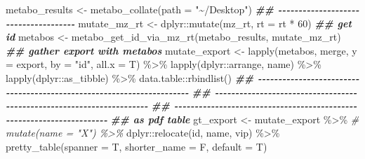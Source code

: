 \documentclass[
]{article}
\newenvironment{Shaded}{\begin{snugshade}}{\end{snugshade}}
\newcommand{\AttributeTok}[1]{\textcolor[rgb]{0.77,0.63,0.00}{#1}}
\newcommand{\CommentTok}[1]{\textcolor[rgb]{0.56,0.35,0.01}{\textit{#1}}}
\newcommand{\DecValTok}[1]{\textcolor[rgb]{0.00,0.00,0.81}{#1}}
\newcommand{\DocumentationTok}[1]{\textcolor[rgb]{0.56,0.35,0.01}{\textbf{\textit{#1}}}}
\newcommand{\FunctionTok}[1]{\textcolor[rgb]{0.00,0.00,0.00}{#1}}
\newcommand{\NormalTok}[1]{#1}
\newcommand{\OtherTok}[1]{\textcolor[rgb]{0.56,0.35,0.01}{#1}}
\newcommand{\SpecialCharTok}[1]{\textcolor[rgb]{0.00,0.00,0.00}{#1}}
\newcommand{\StringTok}[1]{\textcolor[rgb]{0.31,0.60,0.02}{#1}}
\begin{document}
\begin{Shaded}
\begin{Highlighting}[]
\NormalTok{metabo\_results }\OtherTok{\textless{}{-}} \FunctionTok{metabo\_collate}\NormalTok{(}\AttributeTok{path =} \StringTok{"\textasciitilde{}/Desktop"}\NormalTok{)}
\DocumentationTok{\#\# {-}{-}{-}{-}{-}{-}{-}{-}{-}{-}{-}{-}{-}{-}{-}{-}{-}{-}{-}{-}{-}{-}{-}{-}{-}{-}{-}{-}{-}{-}{-}{-}{-}{-}{-}{-}{-} }
\NormalTok{mutate\_mz\_rt }\OtherTok{\textless{}{-}}\NormalTok{ dplyr}\SpecialCharTok{::}\FunctionTok{mutate}\NormalTok{(mz\_rt, }\AttributeTok{rt =}\NormalTok{ rt }\SpecialCharTok{*} \DecValTok{60}\NormalTok{)}
\DocumentationTok{\#\# get id}
\NormalTok{metabos }\OtherTok{\textless{}{-}} \FunctionTok{metabo\_get\_id\_via\_mz\_rt}\NormalTok{(metabo\_results, mutate\_mz\_rt)}
\DocumentationTok{\#\# gather export with metabos}
\NormalTok{mutate\_export }\OtherTok{\textless{}{-}} \FunctionTok{lapply}\NormalTok{(metabos, merge, }\AttributeTok{y =}\NormalTok{ export, }\AttributeTok{by =} \StringTok{"id"}\NormalTok{, }\AttributeTok{all.x =}\NormalTok{ T) }\SpecialCharTok{\%\textgreater{}\%} 
  \FunctionTok{lapply}\NormalTok{(dplyr}\SpecialCharTok{::}\NormalTok{arrange, name) }\SpecialCharTok{\%\textgreater{}\%}
  \FunctionTok{lapply}\NormalTok{(dplyr}\SpecialCharTok{::}\NormalTok{as\_tibble) }\SpecialCharTok{\%\textgreater{}\%} 
\NormalTok{  data.table}\SpecialCharTok{::}\FunctionTok{rbindlist}\NormalTok{()}
\DocumentationTok{\#\# {-}{-}{-}{-}{-}{-}{-}{-}{-}{-}{-}{-}{-}{-}{-}{-}{-}{-}{-}{-}{-}{-}{-}{-}{-}{-}{-}{-}{-}{-}{-}{-}{-}{-}{-}{-}{-}{-}{-}{-}{-}{-}{-}{-}{-}{-}{-}{-}{-}{-}{-}{-}{-}{-}{-}{-}{-}{-}{-}{-}{-}{-}{-}{-}{-}{-}{-}{-}{-}{-}}
\DocumentationTok{\#\# {-}{-}{-}{-}{-}{-}{-}{-}{-}{-}{-}{-}{-}{-}{-}{-}{-}{-}{-}{-}{-}{-}{-}{-}{-}{-}{-}{-}{-}{-}{-}{-}{-}{-}{-}{-}{-}{-}{-}{-}{-}{-}{-}{-}{-}{-}{-}{-}{-}{-}{-}{-}{-}{-}{-}{-}{-}{-}{-}{-}{-}{-}{-}{-}{-}{-}{-}{-}{-}{-} }
\DocumentationTok{\#\# {-}{-}{-}{-}{-}{-}{-}{-}{-}{-}{-}{-}{-}{-}{-}{-}{-}{-}{-}{-}{-}{-}{-}{-}{-}{-}{-}{-}{-}{-}{-}{-}{-}{-}{-}{-}{-}{-}{-}{-}{-}{-}{-}{-}{-}{-}{-}{-}{-}{-}{-}{-}{-}{-}{-}{-}{-}{-}{-}{-}{-}{-}{-}{-}{-}{-}{-}{-}{-}{-} }
\DocumentationTok{\#\# as pdf table}
\NormalTok{gt\_export }\OtherTok{\textless{}{-}}\NormalTok{ mutate\_export }\SpecialCharTok{\%\textgreater{}\%}
  \CommentTok{\# mutate(name = "X") \%\textgreater{}\%}
\NormalTok{  dplyr}\SpecialCharTok{::}\FunctionTok{relocate}\NormalTok{(id, name, vip) }\SpecialCharTok{\%\textgreater{}\%}
  \FunctionTok{pretty\_table}\NormalTok{(}\AttributeTok{spanner =}\NormalTok{ T, }\AttributeTok{shorter\_name =}\NormalTok{ F, }\AttributeTok{default =}\NormalTok{ T)}

\end{Highlighting}
\end{Shaded}
\end{document}
